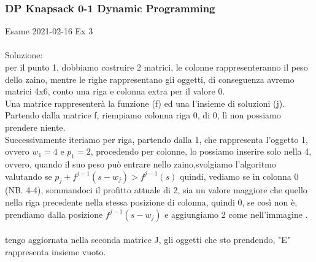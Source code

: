 \documentclass{article}
\begin{document}
\subsubsection{DP Knapsack 0-1 Dynamic Programming}
Esame 2021-02-16 Ex 3\\
\noindent{}%
\\
Soluzione: \\
per il punto 1, dobbiamo costruire 2 matrici, le colonne rappresenteranno il peso dello zaino, mentre le righe rappresentano gli oggetti, di conseguenza avremo matrici 4x6, conto una riga e colonna extra per il valore 0.\\
Una matrice rappresenterà la funzione (f) ed una l'insieme di soluzioni (j).\\
Partendo dalla matrice f, riempiamo colonna riga 0, di 0, lì non possiamo prendere niente.
\\Successivamente iteriamo per riga, partendo dalla 1, che rappresenta l'oggetto 1, ovvero $w_1=4$ e $p_1=2$, procedendo per colonne, lo possiamo inserire solo nella 4, ovvero, quando il suo peso può entrare nello zaino,svolgiamo l'algoritmo valutando se $p_j + f^{j-1}(s-w_j)>f^{j-1}(s)$ quindi, vediamo se in colonna 0 (NB. 4-4), sommandoci il profitto attuale di 2, sia un valore maggiore che quello nella riga precedente nella stessa posizione di colonna, quindi 0, se così non è, prendiamo dalla posizione $f^{j-1}(s-w_j)$ e aggiungiamo 2 come nell'immagine .\\
\\
tengo aggiornata nella seconda matrice J, gli oggetti che sto prendendo, "E" rappresenta insieme vuoto.

\end{document}
